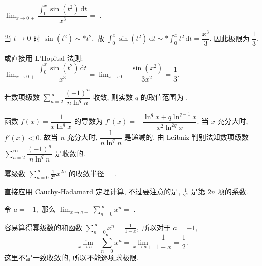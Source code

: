 \begin{question}
$\displaystyle \lim_{x \to 0+} \dfrac{\displaystyle\int_0^x \sin(t^2) ~ \mathrm{d}t}{x^3} =$ \fillin[$\dfrac{1}{3}$].
\end{question}

\begin{solution}
当 $t \to 0$ 时 $\sin(t^2) \sim* t^2,$ 故 $\displaystyle\int_0^x \sin(t^2)\,\mathrm{d}t \sim* \int_0^x t^2\,\mathrm{d}t = \dfrac{x^3}{3}.$ 因此极限为 $\dfrac{1}{3}.$

或直接用 L'Hopital 法则: $\displaystyle\lim_{x\to 0+} \dfrac{\int_0^x \sin(t^2)\,\mathrm{d}t}{x^3} = \lim_{x\to 0+} \dfrac{\sin(x^2)}{3x^2} = \dfrac{1}{3}.$
\end{solution}


\begin{question}
若数项级数 $\displaystyle \sum_{n=2}^\infty \dfrac{(-1)^n}{n \ln^q n}$ 收敛, 则实数 $q$ 的取值范围为 \fillin[$\mathbb{R}$].
\end{question}

\begin{solution}
函数 $\displaystyle f(x) = \dfrac{1}{x \ln^q x}$ 的导数为 $\displaystyle f'(x) = -\dfrac{\ln^q x + q\ln^{q-1} x}{x^2 \ln^{2q} x}.$ 当 $x$ 充分大时, $f'(x) < 0.$ 故当 $n$ 充分大时, $\displaystyle \dfrac{1}{n \ln^q n}$ 是递减的, 由 Leibniz 判别法知数项级数 $\displaystyle \sum_{n=2}^\infty \dfrac{(-1)^n}{n \ln^q n}$ 是收敛的.
\end{solution}


\begin{question}
幂级数 $\sum_{n=0}^\infty \frac{1}{2^n}x^{2n}$ 的收敛半径 = \fillin[$\sqrt{2}$].
\end{question}

\begin{solution}
直接应用 Cauchy-Hadamard 定理计算, 不过要注意的是, $\frac{1}{2^n}$ 是第 $2n$ 项的系数.
\end{solution}


\begin{question}
令 $a = -1,$ 那么 $\displaystyle \lim_{x \to a+} \sum_{n=0}^{\infty} x^n =$ \fillin[$1/2$].
\end{question}

\begin{solution}
容易算得幂级数的和函数 $\sum_{n=0}^{\infty} x^n = \frac{1}{1-x},$ 所以对于 $a = -1,$
\[
\lim_{x \to a+} \sum_{n=0}^{\infty} x^n = \lim_{x \to a+} \frac{1}{1-x} = \frac{1}{2}.
\]
这里不是一致收敛的, 所以不能逐项求极限.
\end{solution}


